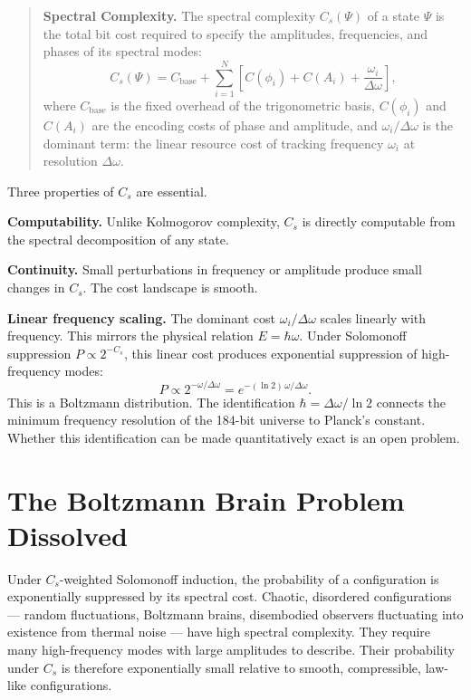 \begin{quote}
\textbf{Spectral Complexity.} The spectral complexity $C_s(\Psi)$ of a
state $\Psi$ is the total bit cost required to specify the amplitudes,
frequencies, and phases of its spectral modes:
\[
C_s(\Psi) = C_{\mathrm{base}}
+ \sum_{i=1}^{N} \left[ C(\phi_i) + C(A_i) + \frac{\omega_i}{\Delta\omega} \right],
\]
where $C_{\mathrm{base}}$ is the fixed overhead of the trigonometric
basis, $C(\phi_i)$ and $C(A_i)$ are the encoding costs of phase and
amplitude, and $\omega_i/\Delta\omega$ is the dominant term: the linear
resource cost of tracking frequency $\omega_i$ at resolution
$\Delta\omega$.
\end{quote}

Three properties of $C_s$ are essential.

\textbf{Computability.} Unlike Kolmogorov complexity, $C_s$ is directly
computable from the spectral decomposition of any state.

\textbf{Continuity.} Small perturbations in frequency or amplitude
produce small changes in $C_s$. The cost landscape is smooth.

\textbf{Linear frequency scaling.} The dominant cost $\omega_i/\Delta\omega$
scales linearly with frequency. This mirrors the physical relation
$E = \hbar\omega$. Under Solomonoff suppression $P \propto 2^{-C_s}$,
this linear cost produces exponential suppression of high-frequency
modes:
\[
P \propto 2^{-\omega/\Delta\omega} = e^{-(\ln 2)\,\omega/\Delta\omega}.
\]
This is a Boltzmann distribution. The identification $\hbar = \Delta\omega/\ln 2$
connects the minimum frequency resolution of the 184-bit universe to
Planck's constant. Whether this identification can be made quantitatively
exact is an open problem.

\section{The Boltzmann Brain Problem Dissolved}

Under $C_s$-weighted Solomonoff induction, the probability of a
configuration is exponentially suppressed by its spectral cost. Chaotic,
disordered configurations --- random fluctuations, Boltzmann brains,
disembodied observers fluctuating into existence from thermal noise ---
have high spectral complexity. They require many high-frequency modes
with large amplitudes to describe. Their probability under $C_s$ is
therefore exponentially small relative to smooth, compressible, law-like
configurations.

